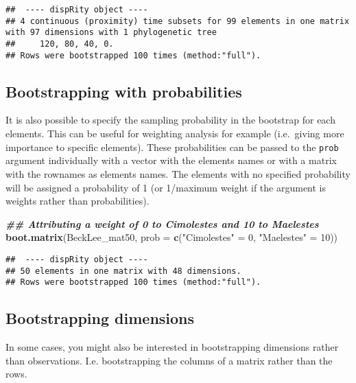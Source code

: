 \documentclass[
]{book}
\newenvironment{Shaded}{\begin{snugshade}}{\end{snugshade}}
\newcommand{\AttributeTok}[1]{\textcolor[rgb]{0.13,0.29,0.53}{#1}}
\newcommand{\DecValTok}[1]{\textcolor[rgb]{0.00,0.00,0.81}{#1}}
\newcommand{\DocumentationTok}[1]{\textcolor[rgb]{0.56,0.35,0.01}{\textbf{\textit{#1}}}}
\newcommand{\FunctionTok}[1]{\textcolor[rgb]{0.13,0.29,0.53}{\textbf{#1}}}
\newcommand{\NormalTok}[1]{#1}
\newcommand{\OtherTok}[1]{\textcolor[rgb]{0.56,0.35,0.01}{#1}}
\newcommand{\StringTok}[1]{\textcolor[rgb]{0.31,0.60,0.02}{#1}}
\begin{document}
\begin{verbatim}
##  ---- dispRity object ---- 
## 4 continuous (proximity) time subsets for 99 elements in one matrix with 97 dimensions with 1 phylogenetic tree
##     120, 80, 40, 0.
## Rows were bootstrapped 100 times (method:"full").
\end{verbatim}

\hypertarget{bootstrapping-with-probabilities}{%
\subsection{Bootstrapping with probabilities}\label{bootstrapping-with-probabilities}}

It is also possible to specify the sampling probability in the bootstrap for each elements.
This can be useful for weighting analysis for example (i.e.~giving more importance to specific elements).
These probabilities can be passed to the \texttt{prob} argument individually with a vector with the elements names or with a matrix with the rownames as elements names.
The elements with no specified probability will be assigned a probability of 1 (or 1/maximum weight if the argument is weights rather than probabilities).

\begin{Shaded}
\begin{Highlighting}[]
\DocumentationTok{\#\# Attributing a weight of 0 to Cimolestes and 10 to Maelestes}
\FunctionTok{boot.matrix}\NormalTok{(BeckLee\_mat50,}
            \AttributeTok{prob =} \FunctionTok{c}\NormalTok{(}\StringTok{"Cimolestes"} \OtherTok{=} \DecValTok{0}\NormalTok{, }\StringTok{"Maelestes"} \OtherTok{=} \DecValTok{10}\NormalTok{))}
\end{Highlighting}
\end{Shaded}

\begin{verbatim}
##  ---- dispRity object ---- 
## 50 elements in one matrix with 48 dimensions.
## Rows were bootstrapped 100 times (method:"full").
\end{verbatim}

\hypertarget{bootstrapping-dimensions}{%
\subsection{Bootstrapping dimensions}\label{bootstrapping-dimensions}}

In some cases, you might also be interested in bootstrapping dimensions rather than observations.
I.e. bootstrapping the columns of a matrix rather than the rows.
\end{document}

